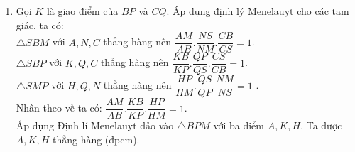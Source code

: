 \begin{ex}
{\begin{enumerate}
        $\Rightarrow \dfrac{SD}{SH}=\dfrac{SH}{SE}\Rightarrow SH^2=SD.SE$ $(1)$\\
        Xét $\triangle SBD$ và $\triangle SEC$ có $\widehat{DSB}$ chung và $\widehat{SBD}=\widehat{SEC}$ (cùng bù với $\widehat{CDB}$)\\
         $\Rightarrow \triangle SBD\backsim\triangle SEC$ (g.g).\\
        $\Rightarrow \dfrac{SB}{SD}=\dfrac{SE}{SC}\Rightarrow SD.SE=SB.SC$ $(2)$.\\
        Từ $(1)$ và $(2)$ ta có $SH^2=SB.SC$ (đpcm).
        \item Gọi $K$ là giao điểm của $BP$ và $CQ$. Áp dụng định lý Menelauyt cho các tam giác, ta có:\\
        $\triangle SBM$ với $A,N,C$ thẳng hàng nên $\dfrac{AM}{AB}.\dfrac{NS}{NM}.\dfrac{CB}{CS}=1$.\\
        $\triangle SBP$ với $K,Q,C$ thẳng hàng nên $\dfrac{KB}{KP}.\dfrac{QP}{QS}.\dfrac{CS}{CB}=1$.\\
        $\triangle SMP$ với $H,Q,N$ thẳng hàng nên $\dfrac{HP}{HM}.\dfrac{QS}{QP}.\dfrac{NM}{NS}=1$ .\\
        Nhân theo vế ta có: $\dfrac{AM}{AB}.\dfrac{KB}{KP}.\dfrac{HP}{HM}=1$.\\
       Áp dụng Định lí Menelauyt đảo vào $\triangle BPM$ với ba điểm $A,K,H$. Ta được $A,K,H$ thẳng hàng (đpcm).
    \end{enumerate}
    }
\end{ex}

